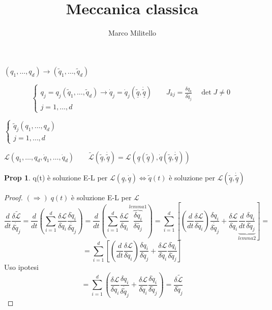 \documentclass[a4paper,11pt]{report}
\theoremstyle{remark}
\theoremstyle{definition}
\newtheorem*{prop}{Prop}
\begin{document}
	\date{}
	\author{Marco Militello}
	\title{Meccanica classica}
	\maketitle
	\tableofcontents
	\newpage

$(q_1,\dots,q_d) \to (\tilde{q}_1,\dots,\tilde{q}_d) $

\[\begin{cases}
	q_j = q_j (\tilde{q}_1,\dots, \tilde{q}_d) \to \dot{q}_j = \dot{q}_j(\tilde{\underline{q}},\dot{\underline{\tilde{q}}}) \qquad J_{kj} = \frac{\delta q_k}{\delta \tilde{q}_j} \quad \det J \ne 0\\
	j = 1,\dots,d 
\end{cases}\]

$\begin{cases}
	\tilde{q}_j (q_1,\dots,q_d) \\
	j=1,\dots,d
\end{cases}$
\newline

\noindent $\mathcal{L} (q_1,\dots,q_d,\dot{q}_1,\dots,\dot{q}_d) \qquad \tilde{\mathcal{L}}(\underline{\tilde{q}},\underline{\dot{\tilde
q}}) = \mathcal{L} (\underline{q}(\underline{\tilde{q}}),\dot{q}(\underline{\tilde{q}},\underline{\dot{\tilde{q}}}))$

\begin{prop}
	q(t) è soluzione E-L per $\mathcal{L}(\underline{q},\underline{\dot{q}}) \iff \tilde{q}(t)$ è soluzione per $\mathcal{L}(\underline{\tilde{q}}, \underline{\dot{\tilde{q}}})$
\end{prop}

\begin{proof}
	$(\Rightarrow) \; q(t)$ è soluzione E-L per $\mathcal{L}$ 
	\[\frac{d}{dt}\frac{\delta \tilde{\mathcal{L}}}{\delta \dot{\tilde{q}}_j} = \frac{d}{dt} \left(\sum_{i=1}^d \frac{\delta \mathcal{L}}{\delta \dot{q}_i} \frac{\delta \dot{q}_i}{\delta \dot{\tilde{q}}_j} \right) = \frac{d}{dt} \left(\sum_{i=1}^d \frac{\delta \mathcal{L}}{\delta \dot{q}_i} \overbrace{\frac{\delta q_i}{\delta \tilde{q_j}}}^{lemma 1}\right) = \sum_{i=1}^d \left[\left(\frac{d}{dt}\frac{\delta\mathcal{L}}{\delta \dot{q}_i}\right)\frac{\delta q_i}{\delta \dot{\tilde{q}}_j} + \frac{\delta \mathcal{L}}{\delta\dot{q}_i}\underbrace{\frac{d}{dt}\frac{\delta q_i}{\delta \tilde{q}_j}}_{lemma 2}\right] =\]
	\[=\sum_{i=1}^d \left[\left(\frac{d}{dt}\frac{\delta\mathcal{L}}{\delta\dot{q}_i}\right)\frac{\delta q_i}{\delta \dot{q}_j} + \frac{\delta\mathcal{L}}{\delta \dot{q}_i}\frac{\delta \dot{q}_i}{\delta\tilde{q}_j}\right]\]
	Uso ipotesi
	\[= \sum_{i=1}^d \left(\frac{\delta \mathcal{L}}{\delta q_i}\frac{\delta q_i}{\delta \dot{\tilde{q}}_j} + \frac{\delta\mathcal{L}}{\delta\dot{q}_i} \frac{\delta\dot{q}_i}{\delta\tilde{q}_j}\right) = \frac{\delta\tilde{\mathcal{L}}}{\delta\tilde{q}_j}\]
\end{proof}
\end{document}
